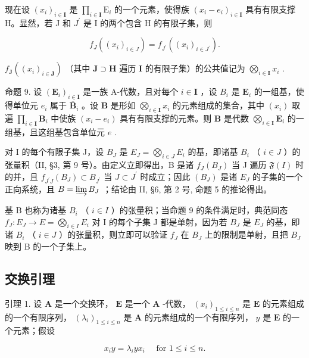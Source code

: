 现在设 \((x_{i})_{i\in \mathbf{I}}\) 是 \(\prod_{i\in \mathbf{I}}\mathrm{E}_i\) 的一个元素，使得族 \((x_{i} - e_{i})_{i\in \mathbf{I}}\) 具有有限支撑 H。显然，若 J 和 \(J^{\prime}\) 是 I 的两个包含 H 的有限子集，则

\[
f _ {J} ((x _ {i}) _ {i \in J}) = f _ {J ^ {\prime}} ((x _ {i}) _ {i \in J ^ {\prime}}).
\]

 \(f_{\mathbf{J}}((x_i)_{i \in \mathbf{J}})\) （其中 \(\mathbf{J} \supset \mathbf{H}\) 遍历 \(\mathbf{I}\) 的有限子集）的公共值记为 \(\bigotimes_{i \in \mathbf{I}} x_i\) .

命题 9. 设 \((\mathbf{E}_i)_{i\in \mathbf{I}}\) 是一族 A-代数，且对每个 \(i\in \mathbf{I}\) ，设 \(B_{i}\) 是 \(\mathbf{E}_i\) 的一组基，使得单位元 \(e_i\) 属于 \(\overline{\mathbf{B}}_i\) 。设 \(\mathbf{B}\) 是形如 \(\bigotimes_{i\in \mathbf{I}}x_i\) 的元素组成的集合，其中 \((x_{i})\) 取遍 \(\prod_{i\in \mathbf{I}}\mathbf{B}_i\) 中使族 \((x_{i} - e_{i})\) 具有有限支撑的元素。则 \(\mathbf{B}\) 是代数 \(\bigotimes_{i\in \mathbf{I}}\mathbf{E}_i\) 的一组基，且这组基包含单位元 \(e\) .

对 I 的每个有限子集 J，设 \(B_{J}\) 是 \(E_{J} = \bigotimes_{i \in J} E_{i}\) 的基，即诸基 \(B_{i}\) （ \(i \in J\) ）的张量积（II, §3, 第 9 号）。由定义立即得出，B 是诸 \(f_{J}(B_{J})\) 当 J 遍历 \(\mathfrak{F}(I)\) 时的并，且 \(f_{J^{\prime}J}(B_{J}) \subset B_{J^{\prime}}\) 当 \(J \subset J^{\prime}\) 时成立；因此 \((B_{J})\) 是诸 \(E_{J}\) 的子集的一个正向系统，且 \(B = \varinjlim B_{J}\) ；结论由 II, §6, 第 2 号, 命题 5 的推论得出。

基 B 也称为诸基 \(B_{i}\) （ \(i \in I\) ）的张量积；当命题 9 的条件满足时，典范同态 \(f_{J}: E_{J} \to E = \bigotimes_{i \in I} E_{i}\) 对 I 的每个子集 J 都是单射，因为若 \(B_{J}\) 是 \(E_{J}\) 的基，即诸 \(B_{i}\) （ \(i \in J\) ）的张量积，则立即可以验证 \(f_{J}\) 在 \(B_{J}\) 上的限制是单射，且把 \(B_{J}\) 映到 B 的一个子集上。

\subsection{交换引理}

引理 1. 设 \(\mathbf{A}\) 是一个交换环， \(\mathbf{E}\) 是一个 \(\mathbf{A}\) -代数， \((x_{i})_{1\leqslant i\leqslant n}\) 是 \(\mathbf{E}\) 的元素组成的一个有限序列， \((\lambda_i)_{1\leqslant i\leqslant n}\) 是 \(\mathbf{A}\) 的元素组成的一个有限序列， \(y\) 是 \(\mathbf{E}\) 的一个元素；假设

\[
x _ {i} y = \lambda_ {i} y x _ {i} \quad \text { for } 1 \leqslant i \leqslant n.\tag{13}
\]

